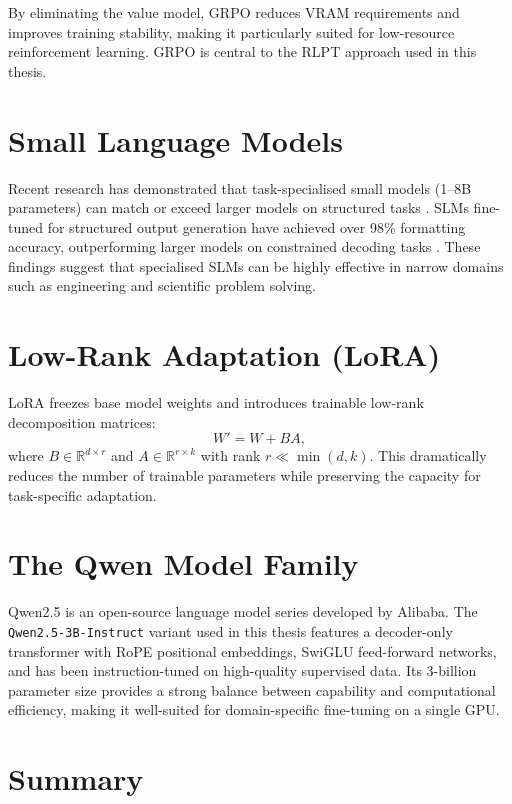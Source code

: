 \documentclass[12pt]{report}
\begin{document}
By eliminating the value model, GRPO reduces VRAM requirements and improves training stability, making it particularly suited for low-resource reinforcement learning. GRPO is central to the RLPT approach used in this thesis.

\section{Small Language Models}

Recent research has demonstrated that task-specialised small models (1--8B parameters) can match or exceed larger models on structured tasks \citep{slm_survey2025}. SLMs fine-tuned for structured output generation have achieved over 98\% formatting accuracy, outperforming larger models on constrained decoding tasks \citep{redhat_slm2024}. These findings suggest that specialised SLMs can be highly effective in narrow domains such as engineering and scientific problem solving.

\section{Low-Rank Adaptation (LoRA)}

LoRA \citep{hu2022lora} freezes base model weights and introduces trainable low-rank decomposition matrices:
\begin{equation}
W' = W + BA,
\end{equation}
where $B \in \mathbb{R}^{d \times r}$ and $A \in \mathbb{R}^{r \times k}$ with rank $r \ll \min(d,k)$. This dramatically reduces the number of trainable parameters while preserving the capacity for task-specific adaptation.

\section{The Qwen Model Family}

Qwen2.5 \citep{qwen2024} is an open-source language model series developed by Alibaba. The \texttt{Qwen2.5-3B-Instruct} variant used in this thesis features a decoder-only transformer with RoPE positional embeddings, SwiGLU feed-forward networks, and has been instruction-tuned on high-quality supervised data. Its 3-billion parameter size provides a strong balance between capability and computational efficiency, making it well-suited for domain-specific fine-tuning on a single GPU.

\section{Summary}
\end{document}

